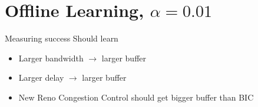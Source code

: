 \documentclass[xcolor={dvipsnames}]{beamer}
\begin{document}
\section{Offline Learning, $\alpha=0.01$}

\begin{frame}{Measuring success}
Should learn
\begin{itemize}
\item Larger bandwidth $\rightarrow$ larger buffer
\item Larger delay $\rightarrow$ larger buffer
\item New Reno Congestion Control should get bigger buffer than BIC
\end{itemize}
\end{frame}


%
%
%
\end{document}
